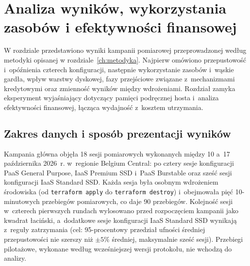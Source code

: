
\chapter[Analiza wyników i efektywności finansowej]{Analiza wyników, wykorzystania zasobów i efektywności finansowej}
\label{ch:wyniki}

W rozdziale przedstawiono wyniki kampanii pomiarowej przeprowadzonej według metodyki
opisanej w rozdziale~\ref{ch:metodyka}. Najpierw omówiono przepustowość i~opóźnienia
czterech konfiguracji, następnie wykorzystanie zasobów i~wąskie gardła, wpływ warstwy
dyskowej, fazy przejściowe związane z~mechanizmami kredytowymi oraz zmienność wyników
między wdrożeniami. Rozdział zamyka eksperyment wyjaśniający dotyczący pamięci podręcznej
hosta i~analiza efektywności finansowej, łącząca wydajność z~kosztem utrzymania.

\section{Zakres danych i sposób prezentacji wyników}
\label{sec:wyniki-zakres}

Kampania główna objęła 18 sesji pomiarowych wykonanych między 10 a~17 października 2026~r.
w~regionie Belgium Central: po cztery sesje konfiguracji PaaS General Purpose, IaaS
Premium SSD i~PaaS Burstable oraz sześć sesji konfiguracji IaaS Standard SSD. Każda sesja
była osobnym wdrożeniem środowiska (od \texttt{terraform apply} do \texttt{terraform destroy})
i~obejmowała pięć 10-minutowych przebiegów pomiarowych, co daje 90 przebiegów. Kolejność
sesji w~czterech pierwszych rundach wylosowano przed rozpoczęciem kampanii jako kwadrat
łaciński, a~dodatkowe sesje konfiguracji IaaS Standard SSD wynikają z~reguły zatrzymania
(cel: 95-procentowy przedział ufności średniej przepustowości nie szerszy niż $\pm5\%$
średniej, maksymalnie sześć sesji). Przebiegi pilotażowe, wykonane według wcześniejszej
wersji protokołu, nie wchodzą do analizy.

